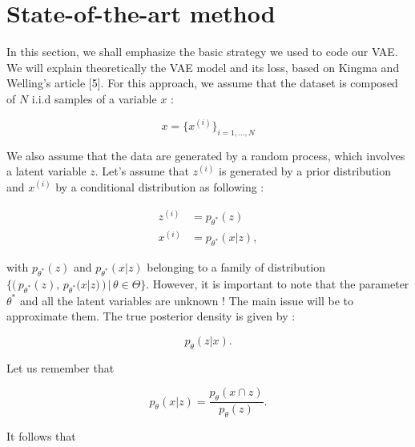 \documentclass{article}
\begin{document}
\section{State-of-the-art method}

In this section, we shall emphasize the basic strategy we used to code our VAE. We will explain theoretically the VAE model and its loss, based on Kingma and Welling's article [5]. For this approach, we assume that the dataset is composed of $N$ i.i.d samples of a variable $x$ :

\begin{center}
    \[ x = \{x^{(i)}\}_{i=1,...,N}\]
\end{center}
We also assume that the data are generated by a random process, which involves a latent variable $z$. Let's assume that $z^{(i)}$ is generated by a prior distribution and $x^{(i)}$ by a conditional distribution as following :

\begin{center}
    \begin{align*}
        z^{(i)} &= p_{\theta^{*}}(z) \\
        x^{(i)} &= p_{\theta^{*}}(x | z),
    \end{align*}
\end{center}
with $p_{\theta^{*}}(z)$ and $p_{\theta^{*}}(x | z)$ belonging to a family of distribution $\{  ( \,p_{\theta^{*}}(z), \, p_{\theta^{*}}(x | z)\,) \,|\, \theta \in \Theta \}$. However, it is important to note that the parameter $\theta^*$ and all the latent variables are unknown ! The main issue will be to approximate them. The true posterior density is given by :
\begin{center}
    \[p_\theta(z | x).\]
\end{center}
Let us remember that
\begin{center}
    \[p_\theta(x|z) = \frac{p_\theta(x \cap z)}{p_\theta (z)}.\]
\end{center}

It follows that 
\end{document}
